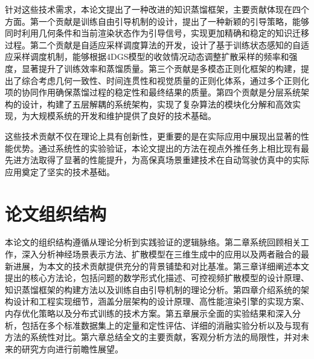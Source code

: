 针对这些技术需求，本论文提出了一种改进的知识蒸馏框架，主要贡献体现在四个方面。第一个贡献是训练自由引导机制的设计，提出了一种新颖的引导策略，能够同时利用几何条件和当前渲染状态作为引导信号，实现更加精确和稳定的知识迁移过程。第二个贡献是自适应采样调度算法的开发，设计了基于训练状态感知的自适应采样调度机制，能够根据4DGS模型的收敛情况动态调整扩散采样的频率和强度，显著提升了训练效率和蒸馏质量。第三个贡献是多模态正则化框架的构建，提出了综合考虑几何一致性、时间连贯性和视觉质量的正则化体系，通过多个正则化项的协同作用确保蒸馏过程的稳定性和最终结果的质量。第四个贡献是分层系统架构的设计，构建了五层解耦的系统架构，实现了复杂算法的模块化分解和高效实现，为大规模系统的开发和维护提供了良好的技术基础。

这些技术贡献不仅在理论上具有创新性，更重要的是在实际应用中展现出显著的性能优势。通过系统性的实验验证，本论文提出的方法在视点外推任务上相比现有最先进方法取得了显著的性能提升，为高保真场景重建技术在自动驾驶仿真中的实际应用奠定了坚实的技术基础。

\section{论文组织结构}

本论文的组织结构遵循从理论分析到实践验证的逻辑脉络。第二章系统回顾相关工作，深入分析神经场景表示方法、扩散模型在三维生成中的应用以及两者融合的最新进展，为本文的技术贡献提供充分的背景铺垫和对比基准。第三章详细阐述本文提出的核心方法论，包括问题的数学形式化描述、可控视频扩散模型的设计原理、知识蒸馏框架的构建方法以及训练自由引导机制的理论分析。第四章介绍系统的架构设计和工程实现细节，涵盖分层架构的设计原理、高性能渲染引擎的实现方案、内存优化策略以及分布式训练的技术方案。第五章展示全面的实验结果和深入分析，包括在多个标准数据集上的定量和定性评估、详细的消融实验分析以及与现有方法的系统性对比。第六章总结全文的主要贡献，客观分析方法的局限性，并对未来的研究方向进行前瞻性展望。
